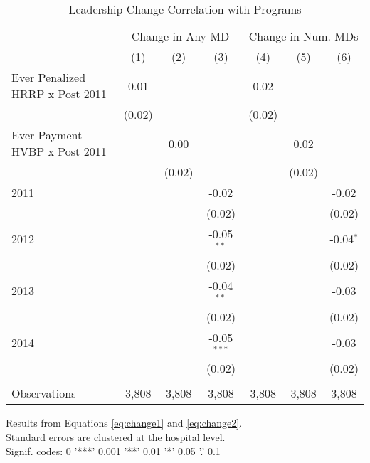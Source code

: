 \begin{table}[ht!]
   \caption{\label{tab:change_analysis}Leadership Change Correlation with Programs}
   \centering
   \begin{tabular}{lcccccc}
      \toprule
       & \multicolumn{3}{c}{Change in Any MD} & \multicolumn{3}{c}{Change in Num. MDs}\\
                                      & (1)    & (2)    & (3)           & (4)    & (5)    & (6)\\  
      \midrule 
      Ever Penalized HRRP x Post 2011 & 0.01   &        &               & 0.02   &        &   \\   
                                      & (0.02) &        &               & (0.02) &        &   \\   
      Ever Payment HVBP x Post 2011   &        & 0.00   &               &        & 0.02   &   \\   
                                      &        & (0.02) &               &        & (0.02) &   \\   
      2011                            &        &        & -0.02         &        &        & -0.02\\   
                                      &        &        & (0.02)        &        &        & (0.02)\\   
      2012                            &        &        & -0.05$^{**}$  &        &        & -0.04$^{*}$\\   
                                      &        &        & (0.02)        &        &        & (0.02)\\   
      2013                            &        &        & -0.04$^{**}$  &        &        & -0.03\\   
                                      &        &        & (0.02)        &        &        & (0.02)\\   
      2014                            &        &        & -0.05$^{***}$ &        &        & -0.03\\   
                                      &        &        & (0.02)        &        &        & (0.02)\\   
       \\
      Observations                    & 3,808  & 3,808  & 3,808         & 3,808  & 3,808  & 3,808\\  
      \bottomrule
   \end{tabular}
   
   \par \raggedright 
   \hspace{6mm} Results from Equations \ref{eq:change1} and \ref{eq:change2}.\\
   \hspace{6mm} Standard errors are clustered at the hospital level.\\
   \hspace{6mm} Signif. codes: 0 '***' 0.001 '**' 0.01 '*' 0.05 '.' 0.1
\end{table}

